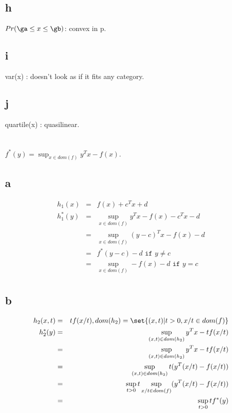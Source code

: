 \documentclass{article}
\begin{document}
\subsection{h}
$Pr(\ga \leq x \leq \gb)$: convex in p.

\subsection{i}
var(x) : doesn't look as if it fits any category. \chk

\subsection{j}
quartile(x) : quasilinear.

\section{}
$f^{*}(y) = \sup_{x \in dom(f)} y^{T}x - f(x)$.

\subsection{a}
\begin{eqnarray*}
h_1(x) &=& f(x) + c^{T}x + d\\
h_1^{*}(y) &=& \sup_{x \in dom(f)} y^{T}x - f(x) - c^{T}x - d\\
&=& \sup_{x \in dom(f)} (y - c)^{T}x - f(x) - d\\
&=& f^{*}(y-c) - d \texttt{ if } y\neq c \\
&=&  \sup_{x \in dom(f)} -f(x) - d \texttt{ if } y= c \\
\end{eqnarray*}


\subsection{b}
\begin{eqnarray*}
h_2(x, t) &=& tf(x/t), dom(h_2) = \set{(x, t)|t>0, x/t \in dom(f)}\\
h_2^{*}(y) &=& \sup_{(x, t) \in dom(h_2)} y^{T}x - tf(x/t)\\
&=& \sup_{(x, t) \in dom(h_2)} y^{T}x - tf(x/t)\\
&=& \sup_{(x, t) \in dom(h_2)} t(y^{T}(x/t) - f(x/t))\\
&=& \sup_{t>0}t \sup_{x/t \in dom(f)} (y^{T}(x/t) - f(x/t))\\
&=& \sup_{t>0} t f^{*}(y)\\
\end{eqnarray*}
\end{document}
